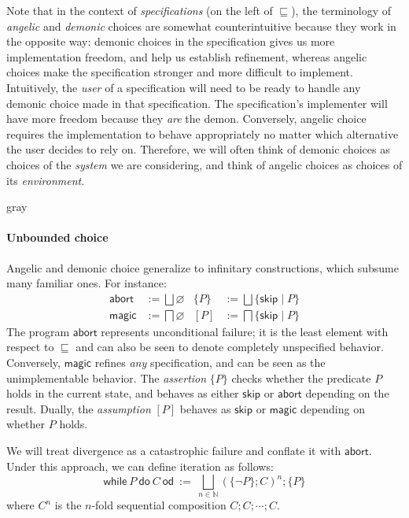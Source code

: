 \documentclass[format=sigplan,authordraft]{acmart}
\newcommand{\kw}[1]{\ensuremath{ \mathsf{#1} }}
\begin{document}
Note that in the context of \emph{specifications}
(on the left of $\sqsubseteq$),
the terminology of \emph{angelic} and \emph{demonic}
choices are somewhat counterintuitive
because they work in the opposite way:
demonic choices in the specification gives us more
implementation freedom,
and help us establish refinement,
whereas angelic choices make the specification
stronger and more difficult to implement.
Intuitively,
the \emph{user} of a specification
will need to be ready to handle any demonic choice
made in that specification.
The specification's implementer
will have more freedom because they \emph{are} the demon.
Conversely,
angelic choice requires the implementation
to behave appropriately
no matter which alternative the user decides to rely on.
Therefore,
we will often think of demonic choices as
choices of the \emph{system} we are considering,
and think of angelic choices as
choices of its \emph{environment}.


\begin{color}{gray}
\paragraph{Unbounded choice} %

Angelic and demonic choice
generalize to infinitary constructions,
which subsume many familiar ones.
For instance:
\begin{align*}
  \kw{abort} &:= \bigsqcup \varnothing &
  \{ P \} &:= \bigsqcup \{ \kw{skip} \mid P \} \\
  \kw{magic} &:= \bigsqcap \varnothing &
  [ P ] &:= \bigsqcap \{ \kw{skip} \mid P \}
\end{align*}
The program $\kw{abort}$ represents unconditional failure;
it is the least element with respect to $\sqsubseteq$
and can also be seen to denote completely unspecified behavior.
Conversely, $\kw{magic}$ refines \emph{any} specification,
and can be seen as the unimplementable behavior.
The \emph{assertion} $\{P\}$ checks whether
the predicate $P$ holds in the current state,
and behaves as either $\kw{skip}$ or $\kw{abort}$
depending on the result.
Dually, the \emph{assumption} $[P]$ behaves as
$\kw{skip}$ or $\kw{magic}$ depending on whether $P$ holds.

We will treat divergence as a catastrophic failure
and conflate it with \kw{abort}.
Under this approach,
we can define iteration as follows:
\[
  \kw{while} \: P \: \kw{do} \: C \: \kw{od} \: := \:
    \bigsqcup_{n \in \mathbb{N}}
    (\{\neg P\}; C)^n ; \{P\}
\]
where $C^n$ is the $n$-fold sequential composition
$C ; C ; \cdots ; C$.


\end{color}
\end{document}
